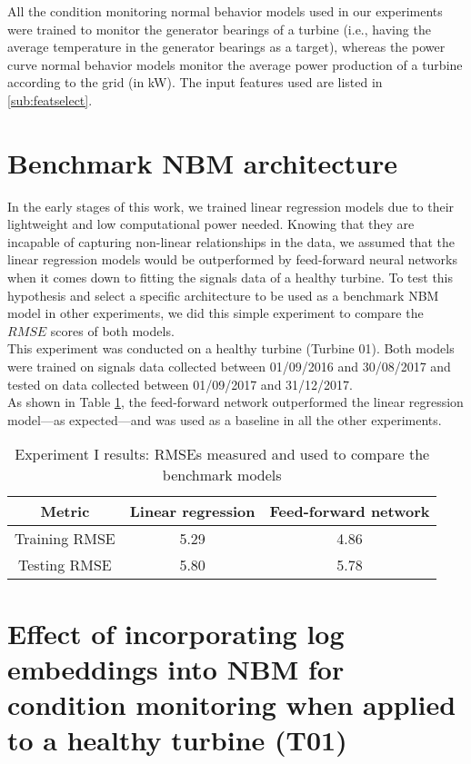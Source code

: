 All the condition monitoring normal behavior models used in our experiments were trained to monitor the generator bearings of a turbine (i.e., having the average temperature in the generator bearings 
as a target), whereas the power curve normal behavior models monitor the average power production of a turbine according to the grid (in kW). The input features used are listed in \ref{sub:featselect}.

\section{Benchmark NBM architecture}
\label{exp:I}

In the early stages of this work, we trained linear regression models due to their lightweight and low computational power needed. Knowing that they are incapable of capturing non-linear
relationships in the data, we assumed that the linear regression models would be outperformed by feed-forward neural networks when it comes down to fitting the 
signals data of a healthy turbine. To test this hypothesis and select a specific architecture to be used as a benchmark NBM model in other experiments, we did this simple experiment 
to compare the $RMSE$ scores of both models.\\
This experiment was conducted on a healthy turbine (Turbine 01). Both models were trained on signals data collected between 01/09/2016 and 30/08/2017 and tested on data collected between
01/09/2017 and 31/12/2017.\\
As shown in Table \ref{tab:Experiment I results}, the feed-forward network outperformed the linear regression model---as expected---and was used as a baseline in all the other experiments.
\begin{table}[H]
        \centering
    \begin{tabular}{|c|c|c|}
    \hline
         \textbf{Metric} & \textbf{Linear regression} & \textbf{Feed-forward network}\\
         \hline
         Training RMSE & 5.29 & 4.86\\
         \hline
         Testing RMSE & 5.80 & 5.78 \\
    \hline
    \end{tabular}
    \caption{Experiment I results: RMSEs measured and used to compare the benchmark models}
        \label{tab:Experiment I results}
\end{table}


\section{Effect of incorporating log embeddings into NBM for condition monitoring when applied to a healthy turbine (T01)}
